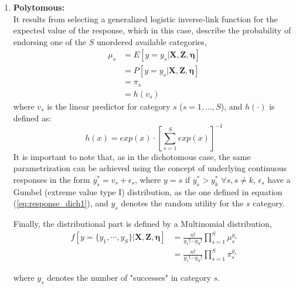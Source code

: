 \begin{enumerate}
	\item \textbf{Polytomous:} \\	
	It results from selecting a generalized logistic inverse-link function \cite{Bock_1972} for the expected value of the response, which in this case, describe the probability of endorsing one of the $S$ unordered available categories,
	\begin{equation} \label{eq:link_poly}
		\begin{split}
			\mu_{s} &= E[y=y_{s} | \mathbf{X}, \mathbf{Z}, \pmb{\eta}] \\
			&= P[y=y_{s} | \mathbf{X}, \mathbf{Z}, \pmb{\eta}] \\
			& = \pi_{s} \\
			&= h(v_{s})
		\end{split}
	\end{equation}	
	where $v_{s}$ is the linear predictor for category $s$ ($s=1, \dots, S$), and $h(\cdot)$ is defined as:
	\begin{equation} \label{eq:response_poly}
		h(x) = exp(x) \cdot \left[\sum_{s=1}^{S} exp(x)\right]^{-1}
	\end{equation}
	It is important to note that, as in the dichotomous case, the same parametrization can be achieved using the concept of underlying continuous responses in the form $y_{s}^{*} = v_{s} + \epsilon_{s}$, where $y = s$ if $y_{s}^{*} > y_{k}^{*}$ $\forall s, s \neq k$, $\epsilon_{s}$ have a Gumbel (extreme value type I) distribution, as the one defined in equation (\ref{eq:response_dich1}), and $y_{s}$ denotes the random utility for the $s$ category.
	
	
	Finally, the distributional part is defined by a Multinomial distribution,
	\begin{equation} \label{eq:dist_poly}
		\begin{split}
			f[y=\{y_{1}, \cdots, y_{S}\} | \mathbf{X}, \mathbf{Z}, \pmb{\eta}] &= \frac{n!}{y_{1}! \cdots y_{S}!} \prod_{s=1}^{S} \mu_{s}^{y_{s}} \\
			&= \frac{n!}{y_{1}! \cdots y_{S}!} \prod_{s=1}^{S} \pi_{s}^{y_{s}}
		\end{split}
	\end{equation}
	
	where $y_{s}$ denotes the number of "successes" in category $s$.
	
	

\end{enumerate}

